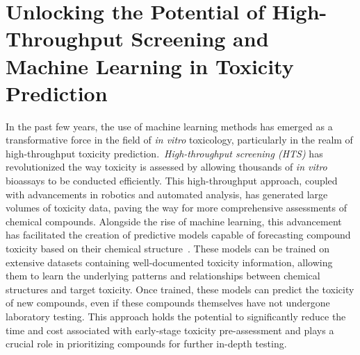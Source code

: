 \section{Unlocking the Potential of High-Throughput Screening and Machine Learning in Toxicity Prediction}

In the past few years, the use of machine learning methods has emerged as a transformative force in the field of \emph{in vitro} toxicology, particularly in the realm of high-throughput toxicity prediction.~\emph{High-throughput screening (HTS)} has revolutionized the way toxicity is assessed by allowing thousands of \emph{in vitro} bioassays to be conducted efficiently. This high-throughput approach, coupled with advancements in robotics and automated analysis, has generated large volumes of toxicity data, paving the way for more comprehensive assessments of chemical compounds.
Alongside the rise of machine learning, this advancement has facilitated the creation of predictive models capable of forecasting compound toxicity based on their chemical structure~\cite{banerjee2018}. These models can be trained on extensive datasets containing well-documented toxicity information, allowing them to learn the underlying patterns and relationships between chemical structures and target toxicity. Once trained, these models can predict the toxicity of new compounds, even if these compounds themselves have not undergone laboratory testing. This approach holds the potential to significantly reduce the time and cost associated with early-stage toxicity pre-assessment and plays a crucial role in prioritizing compounds for further in-depth testing.

